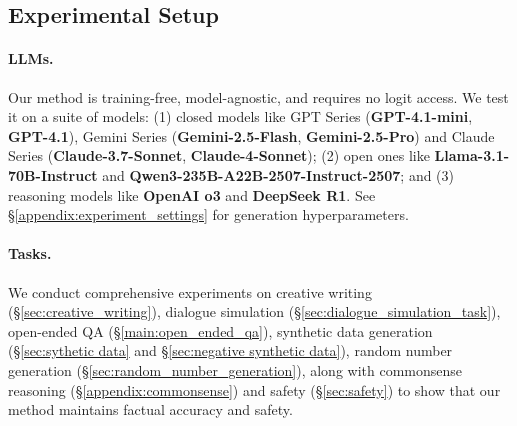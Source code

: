 \subsection{Experimental Setup} \label{sec:experimental_setup}
\paragraph{LLMs.} 

Our method is training-free, model-agnostic, and requires no logit access. We test it on a suite of models: (1) closed models like {GPT Series} (\textbf{GPT-4.1-mini}, \textbf{GPT-4.1}), {Gemini Series} (\textbf{Gemini-2.5-Flash}, \textbf{Gemini-2.5-Pro}) and {Claude Series} (\textbf{Claude-3.7-Sonnet}, \textbf{Claude-4-Sonnet}); (2) open ones like \textbf{Llama-3.1-70B-Instruct} and \textbf{Qwen3-235B-A22B-2507-Instruct-2507}; and (3) {reasoning models} like \textbf{OpenAI o3} and \textbf{DeepSeek R1}. See  \S\ref{appendix:experiment_settings} for generation  hyperparameters.





\paragraph{Tasks.} We conduct comprehensive experiments on creative writing (\S\ref{sec:creative_writing}), dialogue simulation (\S\ref{sec:dialogue_simulation_task}),  open-ended QA (\S\ref{main:open_ended_qa}), synthetic data generation (\S\ref{sec:sythetic data} and \S\ref{sec:negative synthetic data}), random number generation (\S\ref{sec:random_number_generation}), along with commonsense reasoning (\S\ref{appendix:commonsense}) and safety (\S\ref{sec:safety}) to show that our method maintains factual accuracy and safety.

